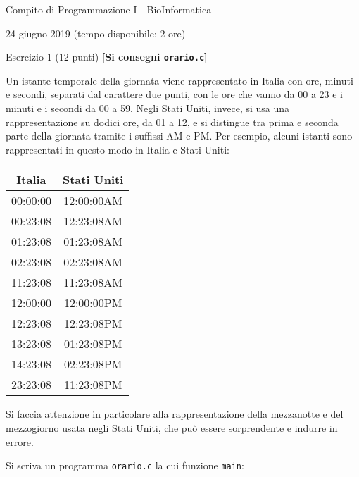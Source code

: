 \documentclass[12pt]{article}
\begin{document}
\begin{center}{\LARGE Compito di Programmazione I - BioInformatica}\\
\vspace*{-2ex}
\begin{center}
  \large 24 giugno 2019 (tempo disponibile: 2 ore)
\end{center}
\end{center}

\vspace*{1ex}
\begin{center}{\Large Esercizio 1} ($12$ punti) \textbf{[Si consegni \texttt{orario.c}]}\end{center}

Un istante temporale della giornata viene rappresentato in Italia
con ore, minuti e secondi, separati dal carattere due punti, con le ore che
vanno da 00 a 23 e i minuti e i secondi da 00 a 59. Negli Stati Uniti, invece, si usa una
rappresentazione su dodici ore, da 01 a 12, e si distingue tra prima e seconda
parte della giornata tramite i suffissi AM e PM. Per esempio, alcuni istanti
sono rappresentati in questo modo in Italia e Stati Uniti:

\begin{center}
  \begin{tabular}{|c|c|}
    \hline
    Italia & Stati Uniti \\\hline\hline
    00:00:00 & 12:00:00AM \\\hline
    00:23:08 & 12:23:08AM \\\hline
    01:23:08 & 01:23:08AM \\\hline
    02:23:08 & 02:23:08AM \\\hline
    11:23:08 & 11:23:08AM \\\hline\hline
    12:00:00 & 12:00:00PM \\\hline
    12:23:08 & 12:23:08PM \\\hline
    13:23:08 & 01:23:08PM \\\hline
    14:23:08 & 02:23:08PM \\\hline
    23:23:08 & 11:23:08PM \\\hline
  \end{tabular}
\end{center}
%
Si faccia attenzione in particolare alla rappresentazione della mezzanotte
e del mezzogiorno usata negli Stati Uniti, che pu\`o essere
sorprendente e indurre in errore.

Si scriva un programma \texttt{orario.c} la cui funzione \texttt{main}:
\end{document}
